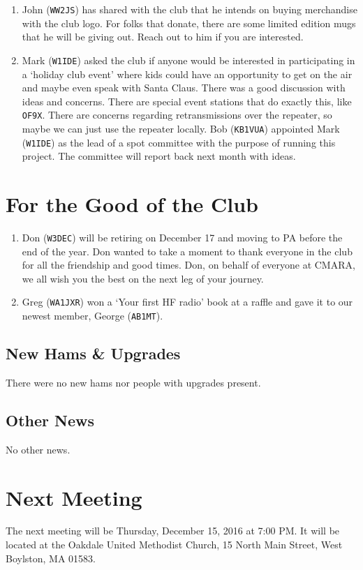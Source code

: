 \documentclass[10pt,letterpaper]{article}
\begin{document}
\begin{enumerate}
\item John (\texttt{WW2JS}) has shared with the club that he intends on buying merchandise with the club logo. For folks that donate, there are some limited edition mugs that he will be giving out. Reach out to him if you are interested.

\item Mark (\texttt{W1IDE}) asked the club if anyone would be interested in participating in a `holiday club event' where kids could have an opportunity to get on the air and maybe even speak with Santa Claus. There was a good discussion with ideas and concerns. There are special event stations that do exactly this, like \texttt{OF9X}. There are concerns regarding retransmissions over the repeater, so maybe we can just use the repeater locally. Bob (\texttt{KB1VUA}) appointed Mark (\texttt{W1IDE}) as the lead of a spot committee with the purpose of running this project. The committee will report back next month with ideas.
\end{enumerate}

\section{For the Good of the Club}
\begin{enumerate}
\item Don (\texttt{W3DEC}) will be retiring on December 17 and moving to PA before the end of the year. Don wanted to take a moment to thank everyone in the club for all the friendship and good times. Don, on behalf of everyone at CMARA, we all wish you the best on the next leg of your journey.
\item Greg (\texttt{WA1JXR}) won a `Your first HF radio' book at a raffle and gave it to our newest member, George (\texttt{AB1MT}).
\end{enumerate}

\subsection{New Hams \& Upgrades}
There were no new hams nor people with upgrades present.

\subsection{Other News}
No other news.

\section{Next Meeting}
The next meeting will be Thursday, December 15, 2016 at 7:00 PM. It will be located at the Oakdale United Methodist Church, 15 North Main Street, West Boylston, MA 01583.
\end{document}
